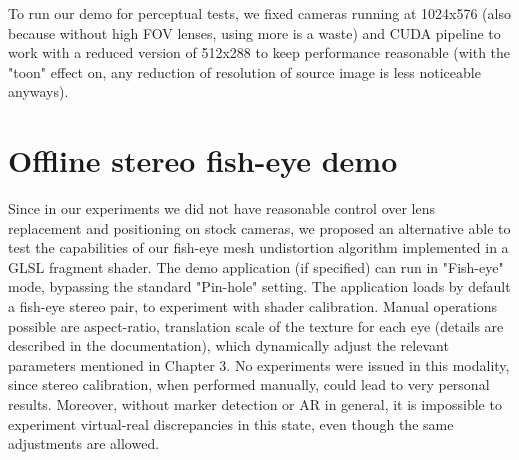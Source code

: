 To run our demo for perceptual tests, we fixed cameras running at 1024x576 (also because without high FOV lenses, using more is a waste) and CUDA pipeline to work with a reduced version of 512x288 to keep performance reasonable (with the "toon" effect on, any reduction of resolution of source image is less noticeable anyways).


\section{Offline stereo fish-eye demo}
Since in our experiments we did not have reasonable control over lens replacement and positioning on stock cameras, we proposed an alternative able to test the capabilities of our fish-eye mesh undistortion algorithm implemented in a GLSL fragment shader. The demo application (if specified) can run in "Fish-eye" mode, bypassing the standard "Pin-hole" setting. The application loads by default a fish-eye stereo pair, to experiment with shader calibration. Manual operations possible are aspect-ratio, translation scale of the texture for each eye (details are described in the documentation), which dynamically adjust the relevant parameters mentioned in Chapter 3.
No experiments were issued in this modality, since stereo calibration, when performed manually, could lead to very personal results. Moreover, without marker detection or AR in general, it is impossible to experiment virtual-real discrepancies in this state, even though the same adjustments are allowed.



